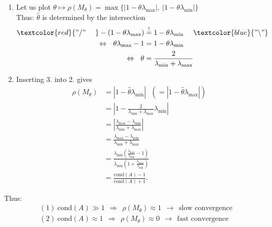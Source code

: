 {\begin{enumerate}
\begin{align*}
	&\textcolor{blue}{b)}~~\Leftrightarrow~~-\theta\lambda_{\text{min}}<0~~\Leftrightarrow~~\theta>0
	\end{align*}
	All in all:
	$$
	\rho(M_\theta)<1~~\Leftrightarrow~~\theta\in\left(0,\frac{2}{\lambda_{\text{max}}}\right)
	$$
	\item Let us plot $\theta \mapsto \rho(M_\theta)= \max\{|1 - \theta \lambda_{\text{max}}|, ~|1 - \theta \lambda_{\text{min}}|\}$\\
	
	Thus: $\hat{\theta}$ is determined by the intersection
	\begin{align*}
	\textcolor{red}{"/"~~~~}-(1-\theta\lambda_{\text{max}})&\stackrel{!}{=}1-\theta\lambda_{\text{min}}~~~~\textcolor{blue}{"\backslash"}\\
	\Leftrightarrow~~\theta\lambda_{\text{max}}-1&=1-\theta\lambda_{\text{min}}\\
	\Leftrightarrow~~\theta&=\frac{2}{\lambda_{\text{min}}+\lambda_{\text{max}}}
	\end{align*}
	\item 
	Inserting 3. into 2. gives
	\begin{align*}
	\rho(M_\theta)&=|1-\hat{\theta}\lambda_{\text{min}}|~~~(=|1-\hat{\theta}\lambda_{\text{max}}|)\\
	&=\left|1-\frac{2}{\lambda_{\text{min}}+\lambda_{\text{max}}}\lambda_{\text{min}}\right|\\
	&=\left|\frac{\lambda_{\text{max}}-\lambda_{\text{min}}}{\lambda_{\text{min}}+\lambda_{\text{max}}}\right|\\
	&=\frac{\lambda_{\text{max}}-\lambda_{\text{min}}}{\lambda_{\text{min}}+\lambda_{\text{max}}}\\
	&=\frac{\lambda_{\text{min}}\left(\frac{\lambda_{\text{max}}}{\lambda_{\text{min}}}-1\right)}{\lambda_{\text{min}}\left(1+\frac{\lambda_{\text{max}}}{\lambda_{\text{min}}}\right)}\\
	&=\frac{\text{cond}(A)-1}{\text{cond}(A)+1}.
	\end{align*}
\end{enumerate}
Thus:
\begin{align*}
&(1)~\text{cond}(A)\gg 1~~\Rightarrow~~\rho(M_\theta)\approx 1~~\rightarrow~~\text{slow convergence}\\
&(2)~\text{cond}(A)\approx 1~~\Rightarrow~~\rho(M_\theta)\approx 0~~\rightarrow~~\text{fast convergence}
\end{align*}
}
